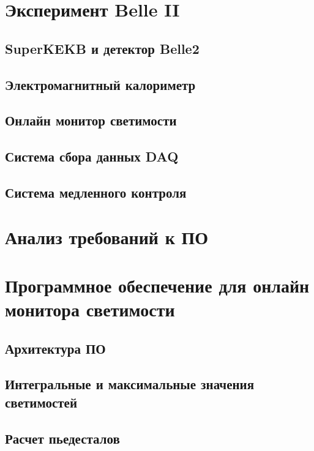 \documentclass[a4paper, 12pt]{article}
\begin{document}
\section{Эксперимент Belle II}
    \subsection{SuperKEKB и детектор Belle2}
    
    \subsection{Электромагнитный калориметр}
    
    \subsection{Онлайн монитор светимости}
    
    \subsection{Система сбора данных DAQ}
    
    \subsection{Система медленного контроля}
    

\section{Анализ требований к ПО}
    

\section{Программное обеспечение для онлайн монитора светимости}
    \subsection{Архитектура ПО}
    
    \subsection{Интегральные и максимальные значения светимостей}
    
    \subsection{Расчет пьедесталов}
    
\end{document}
